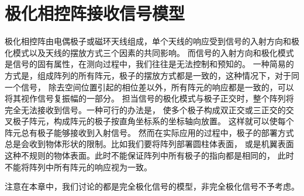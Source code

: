\documentclass[master]{thesis-uestc}
\begin{document}
\section{极化相控阵接收信号模型}
极化相控阵由电偶极子或磁环天线组成，单个天线的响应受到信号的入射方向和极化模式以及天线的摆放方式三个因素的共同影响。
而信号的入射方向和极化模式是信号的固有属性，在测向过程中，我们往往是无法控制和预知的。
一种简易的方式是，组成阵列的所有阵元，极子的摆放方式都是一致的，这种情况下，对于同一个信号，
除去空间位置引起的相位差以外，所有阵元的响应都是一致的，可以将其视作信号复振幅的一部分。
担当信号的极化模式与极子正交时，整个阵列将完全无法接收到信号。一种可行的办法是，
使多个极子构成双正交或三正交的交叉极子阵元，构成阵元的极子按直角坐标系的坐标轴向放置。
这样就可以使每个阵元总有极子能够接收到入射信号。
然而在实际应用的过程中，极子的部署方式总是会收到物体形状的限制。比如我们要将阵列部署圆柱体表面，
或是机翼表面这种不规则的物体表面。此时不能保证阵列中所有极子的指向都是相同的，
此时不能将阵列中所有阵元的响应视为一致。

注意在本章中，我们讨论的都是完全极化信号的模型，非完全极化信号不予考虑。
\end{document}
